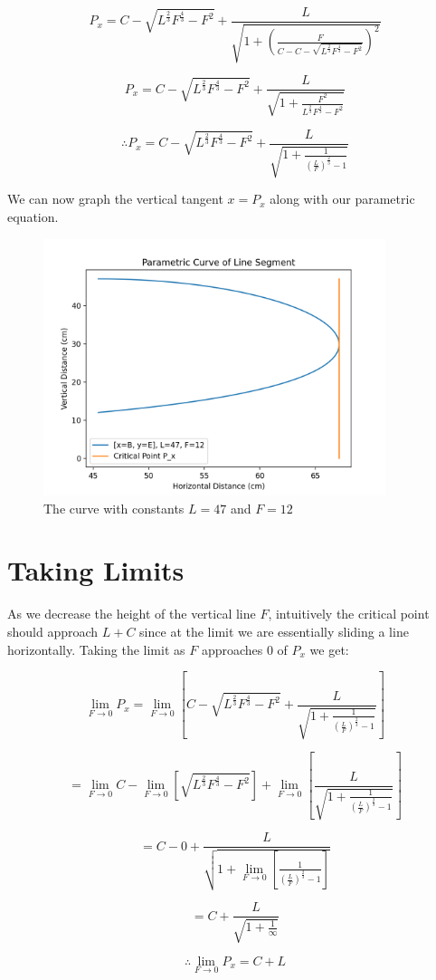 \documentclass{article}
\begin{document}
$$P_x = C - \sqrt{L^{\frac{2}{3}}F^{\frac{4}{3}}-F^2}+ \frac{L}{\sqrt{1+\left(\frac{F}{C-C - \sqrt{L^{\frac{2}{3}}F^{\frac{4}{3}}-F^2}}\right)^2}}$$

$$P_x = C - \sqrt{L^{\frac{2}{3}}F^{\frac{4}{3}}-F^2}+\frac{L}{\sqrt{1+\frac{F^2}{L^{\frac{2}{3}}F^{\frac{4}{3}}-F^2}}}$$

$$\therefore \boxed{P_x = C - \sqrt{L^{\frac{2}{3}}F^{\frac{4}{3}}-F^2}+\frac{L}{\sqrt{1+\frac{1}{\left(\frac{L}{F}\right)^{\frac{2}{3}}-1}}}}$$

\vspace{1 cm}

We can now graph the vertical tangent $x=P_x$ along with our parametric equation.

\begin{figure}[htp]
    \centering
    \includegraphics[width=10cm]{curve-with-critical-point.png}
    \caption{The curve with constants $L=47$ and $F=12$}
\end{figure}

\section{Taking Limits}
As we decrease the height of the vertical line $F$, intuitively the critical point should approach $L+C$ since at the limit we are essentially sliding a line horizontally. Taking the limit as $F$ approaches 0 of $P_x$ we get:

$$\lim_{F\to0}P_x = \lim_{F\to 0}\left[C - \sqrt{L^{\frac{2}{3}}F^{\frac{4}{3}}-F^2}+\frac{L}{\sqrt{1+\frac{1}{\left(\frac{L}{F}\right)^{\frac{2}{3}}-1}}}\right]$$

$$=\lim_{F\to0}C-\lim_{F\to0}\left[\sqrt{L^{\frac{2}{3}}F^{\frac{4}{3}}-F^2}\right] + \lim_{F\to0}\left[\frac{L}{\sqrt{1+\frac{1}{\left(\frac{L}{F}\right)^{\frac{2}{3}}-1}}}\right]$$

$$=C-0+\frac{L}{\sqrt{1+\lim\limits_{F \to 0}\left[\frac{1}{\left(\frac{L}{F}\right)^{\frac{2}{3}}-1}\right]}}$$

$$=C+\frac{L}{\sqrt{1+\frac{1}{\infty}}}$$

$$\therefore \boxed{\lim_{F\to0}P_x =C+L}$$
\end{document}
